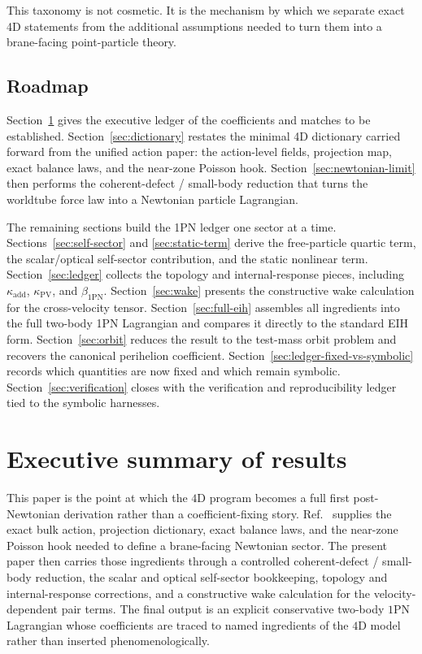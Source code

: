 \documentclass[11pt]{article}
\newcommand{\kadd}{\kappa_{\mathrm{add}}}
\newcommand{\kPV}{\kappa_{\mathrm{PV}}}
\newcommand{\betaPN}{\beta_{\mathrm{1PN}}}
\begin{document}
This taxonomy is not cosmetic. It is the mechanism by which we separate exact 4D statements from the additional assumptions needed to turn them into a brane-facing point-particle theory.

\subsection{Roadmap}
\label{sec:roadmap}

Section~\ref{sec:exec-summary} gives the executive ledger of the coefficients and matches to be established. Section~\ref{sec:dictionary} restates the minimal 4D dictionary carried forward from the unified action paper: the action-level fields, projection map, exact balance laws, and the near-zone Poisson hook. Section~\ref{sec:newtonian-limit} then performs the coherent-defect / small-body reduction that turns the worldtube force law into a Newtonian particle Lagrangian.

The remaining sections build the 1PN ledger one sector at a time. Sections~\ref{sec:self-sector} and \ref{sec:static-term} derive the free-particle quartic term, the scalar/optical self-sector contribution, and the static nonlinear term. Section~\ref{sec:ledger} collects the topology and internal-response pieces, including \(\kadd\), \(\kPV\), and \(\betaPN\). Section~\ref{sec:wake} presents the constructive wake calculation for the cross-velocity tensor. Section~\ref{sec:full-eih} assembles all ingredients into the full two-body 1PN Lagrangian and compares it directly to the standard EIH form. Section~\ref{sec:orbit} reduces the result to the test-mass orbit problem and recovers the canonical perihelion coefficient. Section~\ref{sec:ledger-fixed-vs-symbolic} records which quantities are now fixed and which remain symbolic. Section~\ref{sec:verification} closes with the verification and reproducibility ledger tied to the symbolic harnesses.

\section{Executive summary of results}
\label{sec:exec-summary}

This paper is the point at which the \(4\)D program becomes a full first post-Newtonian derivation rather than a coefficient-fixing story. Ref.~\cite{norris2026_4d_model} supplies the exact bulk action, projection dictionary, exact balance laws, and the near-zone Poisson hook needed to define a brane-facing Newtonian sector. The present paper then carries those ingredients through a controlled coherent-defect / small-body reduction, the scalar and optical self-sector bookkeeping, topology and internal-response corrections, and a constructive wake calculation for the velocity-dependent pair terms. The final output is an explicit conservative two-body \(1\)PN Lagrangian whose coefficients are traced to named ingredients of the \(4\)D model rather than inserted phenomenologically.
\end{document}
